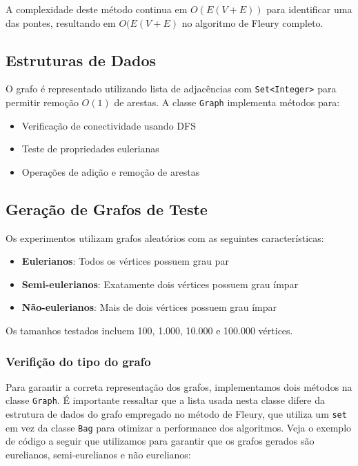 \documentclass[12pt]{article}
\begin{document}
A complexidade deste método continua em \(O(E(V+E))\) para identificar uma das pontes, resultando em \(O(E(V + E)\) no algoritmo de Fleury completo.

\subsection{Estruturas de Dados}

O grafo é representado utilizando lista de adjacências com \texttt{Set<Integer>} para permitir remoção $O(1)$ de arestas. A classe \texttt{Graph} implementa métodos para:

\begin{itemize}
\item Verificação de conectividade usando DFS
\item Teste de propriedades eulerianas
\item Operações de adição e remoção de arestas
\end{itemize}

\subsection{Geração de Grafos de Teste}

Os experimentos utilizam grafos aleatórios com as seguintes características:

\begin{itemize}
\item \textbf{Eulerianos}: Todos os vértices possuem grau par
\item \textbf{Semi-eulerianos}: Exatamente dois vértices possuem grau ímpar  
\item \textbf{Não-eulerianos}: Mais de dois vértices possuem grau ímpar
\end{itemize}

Os tamanhos testados incluem 100, 1.000, 10.000 e 100.000 vértices.

\subsubsection{Verifi\c{c}\~ao do tipo do grafo}
Para garantir a correta representa\c{c}\~ao dos grafos, implementamos dois m\'etodos na classe \texttt{Graph}. \'E importante ressaltar que a lista usada nesta classe difere da estrutura de dados do grafo empregado no m\'etodo de Fleury, que utiliza um \texttt{set} em vez da classe \texttt{Bag} para otimizar a performance dos algoritmos. Veja o exemplo de c\'odigo a seguir que utilizamos para garantir que os grafos gerados s\~ao eurelianos, semi-eurelianos e n\~ao eurelianos:
\end{document}
